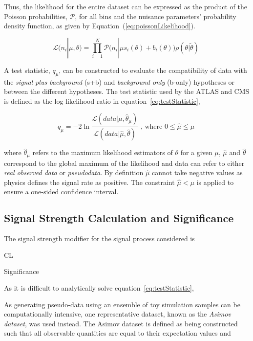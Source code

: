 Thus, the likelihood for the entire dataset can be expressed as the product of the Poisson probabilities, $\mathcal{P}$, for all bins and the nuisance parameters' probability density function, as given by Equation~(\ref{eq:poissonLikelihood}).

\begin{equation}
\mathcal{L} ( n_{i} | \mu , \theta ) = 
\prod_{i=1}^{N} \mathcal{P} \big( n_{i} | \mu s_{i}(\theta) + b_{i}(\theta) \big) \rho ( \theta | \tilde{\theta} ) \;
\label{eq:poissonLikelihood}
\end{equation}

A test statistic, $q_{\mu} $, can be constructed to evaluate the compatibility of data with the \emph{signal plus background} (s+b) and \emph{background only} (b-only) hypotheses or between the different hypotheses.
The test statistic used by the ATLAS and CMS is defined as the log-likelihood ratio in equation~\ref{eq:testStatistic},

\begin{equation}
q_{\mu} =  -2 \ln \frac{ \mathcal{L}(data | \mu , \hat{\theta}_{\mu})} { \mathcal{L}(data | \hat{\mu}, \hat{\theta})  } \textrm{ , where } 0 \leq \hat{\mu} \leq \mu \;
\label{eq:testStatistic}
\end{equation}

where $\hat{\theta}_{\mu}$ refers to the maximum likelihood estimators of $\theta$ for a given $\mu$, $\hat{\mu}$ and $\hat{\theta}$ correspond to the global maximum of the likelihood and data can refer to either \emph{real observed data} or \emph{pseudodata}.
By definition $\hat{\mu}$ cannot take negative values as physics defines the signal rate as positive. 
The constraint $\hat{\mu} < \mu$ is applied to ensure a one-sided confidence interval.

\subsection{Signal Strength Calculation and Significance}\label{subsec:CLsMethod}

The signal strength modifier for the signal process considered is 

CL

Significance

As it is difficult to analytically solve equation~\ref{eq:testStatistic}, 

As generating pseudo-data using an ensemble of toy simulation samples can be computationally intensive, one representative dataset, known as the \emph{Asimov dataset}, was used instead.
The Asimov dataset is defined as being constructed such that all observable quantities are equal to their expectation values and 


